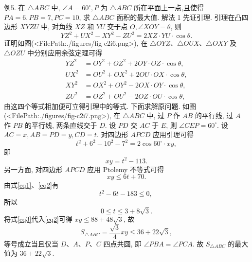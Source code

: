 例5. 在 $\triangle A B C$ 中, $\angle A=60^{\circ}, P$ 为 $\triangle A B C$ 所在平面上一点,且使得 $P A=6, P B=7, P C=10$, 求 $\triangle A B C$ 面积的最大值.
解法 1 先证引理.
引理在凸四边形 $X Y Z U$ 中, 对角线 $X Z$ 和 $Y U$ 交于点 $O, \angle X O Y= \theta$, 则
$$
Y Z^2+U X^2-X Y^2-Z U^2=2 X Z \cdot Y U \cdot \cos \theta .
$$
证明如图(<FilePath:./figures/fig-c2i6.png>), 在 $\triangle O Y Z 、 \triangle O U X 、 \triangle O X Y$ 及 $\triangle O Z U$ 中分别应用余弦定理可得
$$
\begin{aligned}
Y Z^2 & =O Y^2+O Z^2+2 O Y \cdot O Z \cdot \cos \theta, \\
U X^2 & =O U^2+O X^2+2 O U \cdot O X \cdot \cos \theta, \\
X Y^2 & =O X^2+O Y^2-2 O X \cdot O Y \cdot \cos \theta, \\
Z U^2 & =O Z^2+O U^2-2 O Z \cdot O U \cdot \cos \theta,
\end{aligned}
$$
由这四个等式相加便可立得引理中的等式.
下面求解原问题.
如图(<FilePath:./figures/fig-c2i7.png>), 在 $\triangle A B C$ 中, 过 $P$ 作 $A B$ 的平行线, 过 $A$ 作 $P B$ 的平行线, 两条直线交于 $D$. 设 $P D$ 交 $A C$ 于 $E$, 则 $\angle C E P=60^{\circ}$.
设 $A C=x, A B=P D=y, C D=t$. 对四边形 $A P C D$ 应用引理可得
$$
t^2+6^2-10^2-7^2=2 \cos 60^{\circ} \cdot x y,
$$
即
$$
x y=t^2-113 . \label{eq1}
$$
另一方面, 对四边形 $A P C D$ 应用 Ptolemy 不等式可得
$$
x y \leqslant 6 t+70 . \label{eq2}
$$
由式\ref{eq1}、\ref{eq2}有
$$
t^2-6 t-183 \leqslant 0 \text {, }
$$
所以
$$
0 \leqslant t \leqslant 3+8 \sqrt{3} . \label{eq3}
$$
将式\ref{eq3}代入\ref{eq2}可得 $x y \leqslant 88+48 \sqrt{3}$, 故
$$
S_{\triangle A B C}=\frac{\sqrt{3}}{4} x y \leqslant 36+22 \sqrt{3},
$$
等号成立当且仅当 $D 、 A 、 P 、 C$ 四点共圆, 即 $\angle P B A=\angle P C A$. 故 $S_{\triangle A B C}$ 的最大值为 $36+22 \sqrt{3}$.



